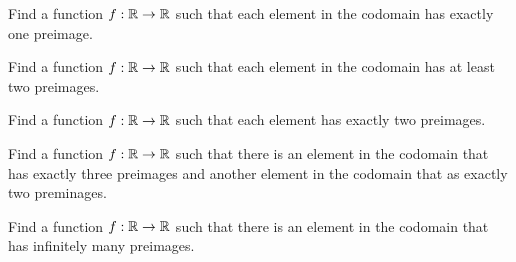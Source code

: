 \label{sec_func_exer}
\be

\item 
	\ba
	\item Find a function $f: \mathbb{R} \to \mathbb{R}$ such that each element in the codomain has exactly one preimage. 

	\item Find a function $f: \mathbb{R} \to \mathbb{R}$ such that each element in the codomain has at least two preimages.
	
	\item Find a function $f: \mathbb{R} \to \mathbb{R}$ such that each element has exactly two preimages. 
	
	\item Find a function $f: \mathbb{R} \to \mathbb{R}$ such that there is an element in the codomain that has exactly three preimages and another element in the codomain that as exactly two preminages.

	
	\item Find a function $f: \mathbb{R} \to \mathbb{R}$ such that there is an element in the codomain that has infinitely many preimages. 	
	\ea


